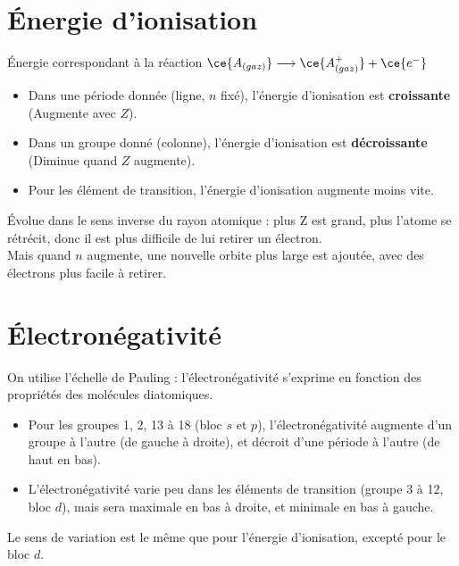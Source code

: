 \documentclass[13pt, twoside, a4paper, french, tikz]{report}
\begin{document}
  
  \section{Énergie d'ionisation}\label{sec:energie-d'ionisation}
    
    Énergie correspondant à la réaction $\ce{A_{(gaz)}} \longrightarrow \ce{A^+_{(gaz)}} + \ce{e^-}$
    
    \begin{itemize}
      \item Dans une période donnée (ligne, $n$ fixé), l'énergie d'ionisation est \textbf{croissante} (Augmente avec $Z$).
      \item Dans un groupe donné (colonne), l'énergie d'ionisation est \textbf{décroissante} (Diminue quand $Z$ augmente).
      \item Pour les élément de transition, l'énergie d'ionisation augmente moins vite.
    \end{itemize}
    \vspace{7pt}
    
    Évolue dans le sens inverse du rayon atomique : plus Z est grand, plus l'atome se rétrécit, donc il est plus difficile de lui retirer un électron.\\
    Mais quand $n$ augmente, une nouvelle orbite plus large est ajoutée, avec des électrons plus facile à retirer.
  
  
  \section{Électronégativité}\label{sec:electronegativite}
    
    On utilise l'échelle de Pauling : l'électronégativité s'exprime en fonction des propriétés des molécules diatomiques.
    
    \begin{itemize}
      \item Pour les groupes 1, 2, 13 à 18 (bloc $s$ et $p$), l'électronégativité augmente d'un groupe à l'autre (de gauche à droite), et décroit d'une période à l'autre (de haut en bas).
      \item L'électronégativité varie peu dans les éléments de transition (groupe 3 à 12, bloc $d$), mais sera maximale en bas à droite, et minimale en bas à gauche.
    \end{itemize}
    \vspace{7pt}
    
    Le sens de variation est le même que pour l'énergie d'ionisation, excepté pour le bloc $d$.
\end{document}
